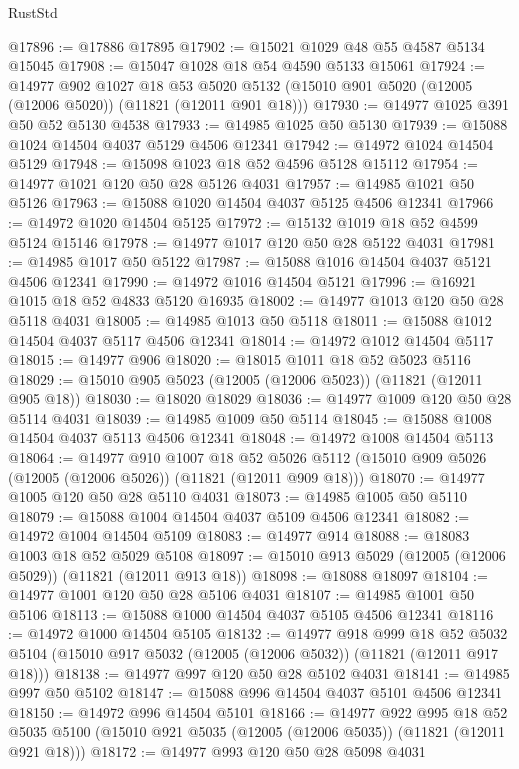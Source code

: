 \begin{lexlean}{RustStd}
\begin{coremodule}
@17896 := @17886 @17895
@17902 := @15021 @1029 @48 @55 @4587 @5134 @15045
@17908 := @15047 @1028 @18 @54 @4590 @5133 @15061
@17924 := @14977
    @902
    @1027
    @18
    @53
    @5020
    @5132
    (@15010 @901 @5020 (@12005 (@12006 @5020)) (@11821 (@12011 @901 @18)))
@17930 := @14977 @1025 @391 @50 @52 @5130 @4538
@17933 := @14985 @1025 @50 @5130
@17939 := @15088 @1024 @14504 @4037 @5129 @4506 @12341
@17942 := @14972 @1024 @14504 @5129
@17948 := @15098 @1023 @18 @52 @4596 @5128 @15112
@17954 := @14977 @1021 @120 @50 @28 @5126 @4031
@17957 := @14985 @1021 @50 @5126
@17963 := @15088 @1020 @14504 @4037 @5125 @4506 @12341
@17966 := @14972 @1020 @14504 @5125
@17972 := @15132 @1019 @18 @52 @4599 @5124 @15146
@17978 := @14977 @1017 @120 @50 @28 @5122 @4031
@17981 := @14985 @1017 @50 @5122
@17987 := @15088 @1016 @14504 @4037 @5121 @4506 @12341
@17990 := @14972 @1016 @14504 @5121
@17996 := @16921 @1015 @18 @52 @4833 @5120 @16935
@18002 := @14977 @1013 @120 @50 @28 @5118 @4031
@18005 := @14985 @1013 @50 @5118
@18011 := @15088 @1012 @14504 @4037 @5117 @4506 @12341
@18014 := @14972 @1012 @14504 @5117
@18015 := @14977 @906
@18020 := @18015 @1011 @18 @52 @5023 @5116
@18029 := @15010 @905 @5023 (@12005 (@12006 @5023)) (@11821 (@12011 @905 @18))
@18030 := @18020 @18029
@18036 := @14977 @1009 @120 @50 @28 @5114 @4031
@18039 := @14985 @1009 @50 @5114
@18045 := @15088 @1008 @14504 @4037 @5113 @4506 @12341
@18048 := @14972 @1008 @14504 @5113
@18064 := @14977
    @910
    @1007
    @18
    @52
    @5026
    @5112
    (@15010 @909 @5026 (@12005 (@12006 @5026)) (@11821 (@12011 @909 @18)))
@18070 := @14977 @1005 @120 @50 @28 @5110 @4031
@18073 := @14985 @1005 @50 @5110
@18079 := @15088 @1004 @14504 @4037 @5109 @4506 @12341
@18082 := @14972 @1004 @14504 @5109
@18083 := @14977 @914
@18088 := @18083 @1003 @18 @52 @5029 @5108
@18097 := @15010 @913 @5029 (@12005 (@12006 @5029)) (@11821 (@12011 @913 @18))
@18098 := @18088 @18097
@18104 := @14977 @1001 @120 @50 @28 @5106 @4031
@18107 := @14985 @1001 @50 @5106
@18113 := @15088 @1000 @14504 @4037 @5105 @4506 @12341
@18116 := @14972 @1000 @14504 @5105
@18132 := @14977
    @918
    @999
    @18
    @52
    @5032
    @5104
    (@15010 @917 @5032 (@12005 (@12006 @5032)) (@11821 (@12011 @917 @18)))
@18138 := @14977 @997 @120 @50 @28 @5102 @4031
@18141 := @14985 @997 @50 @5102
@18147 := @15088 @996 @14504 @4037 @5101 @4506 @12341
@18150 := @14972 @996 @14504 @5101
@18166 := @14977
    @922
    @995
    @18
    @52
    @5035
    @5100
    (@15010 @921 @5035 (@12005 (@12006 @5035)) (@11821 (@12011 @921 @18)))
@18172 := @14977 @993 @120 @50 @28 @5098 @4031

\end{coremodule}
\end{lexlean}
